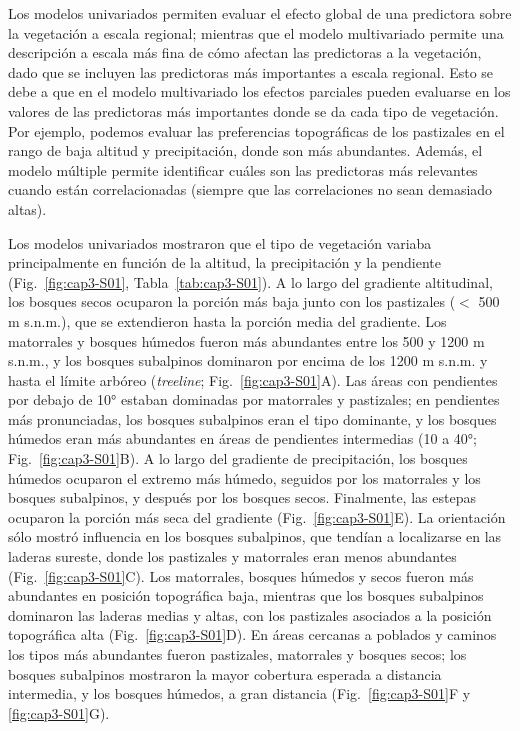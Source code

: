 Los modelos univariados permiten evaluar el efecto global de una predictora sobre la vegetación a escala regional; mientras que el modelo multivariado permite una descripción a escala más fina de cómo afectan las predictoras a la vegetación, dado que se incluyen las predictoras más importantes a escala regional. Esto se debe a que en el modelo multivariado los efectos parciales pueden evaluarse en los valores de las predictoras más importantes donde se da cada tipo de vegetación. Por ejemplo, podemos evaluar las preferencias topográficas de los pastizales en el rango de baja altitud y precipitación, donde son más abundantes. Además, el modelo múltiple permite identificar cuáles son las predictoras más relevantes cuando están correlacionadas (siempre que las correlaciones no sean demasiado altas). 

Los modelos univariados mostraron que el tipo de vegetación variaba principalmente en función de la altitud, la precipitación y la pendiente (Fig.~\ref{fig:cap3-S01}, Tabla~\ref{tab:cap3-S01}). A lo largo del gradiente altitudinal, los bosques secos ocuparon la porción más baja junto con los pastizales ($<$ 500 m s.n.m.), que se extendieron hasta la porción media del gradiente. Los matorrales y bosques húmedos fueron más abundantes entre los 500 y 1200 m s.n.m., y los bosques subalpinos dominaron por encima de los 1200 m s.n.m. y hasta el límite arbóreo (\textit{treeline}; Fig.~\ref{fig:cap3-S01}A). Las áreas con pendientes por debajo de 10° estaban dominadas por matorrales y pastizales; en pendientes más pronunciadas, los bosques subalpinos eran el tipo dominante, y los bosques húmedos eran más abundantes en áreas de pendientes intermedias (10 a 40°; Fig.~\ref{fig:cap3-S01}B). A lo largo del gradiente de precipitación, los bosques húmedos ocuparon el extremo más húmedo, seguidos por los matorrales y los bosques subalpinos, y después por los bosques secos. Finalmente, las estepas ocuparon la porción más seca del gradiente (Fig.~\ref{fig:cap3-S01}E). La orientación sólo mostró influencia en los bosques subalpinos, que tendían a localizarse en las laderas sureste, donde los pastizales y matorrales eran menos abundantes (Fig.~\ref{fig:cap3-S01}C). Los matorrales, bosques húmedos y secos fueron más abundantes en posición topográfica baja, mientras que los bosques subalpinos dominaron las laderas medias y altas, con los pastizales asociados a la posición topográfica alta (Fig.~\ref{fig:cap3-S01}D). En áreas cercanas a poblados y caminos los tipos más abundantes fueron pastizales, matorrales y bosques secos; los bosques subalpinos mostraron la mayor cobertura esperada a distancia intermedia, y los bosques húmedos, a gran distancia (Fig.~\ref{fig:cap3-S01}F y \ref{fig:cap3-S01}G).

